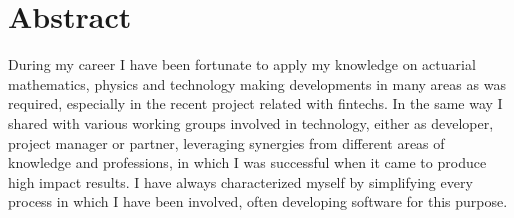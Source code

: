 \section{Abstract}

During my career I have been fortunate to apply my knowledge on actuarial mathematics,
physics and technology making developments in many areas as was required, especially in
the recent project related with fintechs. In the same way I shared with various working groups
involved in technology, either as developer, project manager or partner, leveraging synergies
from different areas of knowledge and professions, in which I was successful when it came
to produce high impact results. I have always characterized myself by simplifying every
process in which I have been involved, often developing software for this purpose.
